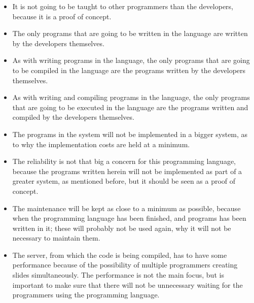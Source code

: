 \begin{itemize}
	\item It is not going to be taught to other programmers than the developers, because it is a proof of concept.
	\item The only programs that are going to be written in the language are written by the developers themselves.
	\item As with writing programs in the language, the only programs that are going to be compiled in the language are the programs written by the developers themselves.
	\item As with writing and compiling programs in the language, the only programs that are going to be executed in the language are the programs written and compiled by the developers themselves.
	\item The programs in the system will not be implemented in a bigger system, as to why the implementation costs are held at a minimum.
	\item The reliability is not that big a concern for this programming language, because the programs written herein will not be implemented as part of a greater system, as mentioned before, but it should be seen as a proof of concept.
	\item The maintenance will be kept as close to a minimum as possible, because when the programming language has been finished, and programs has been written in it; these will probably not be used again, why it will not be necessary to maintain them.
	\item The server, from which the code is being compiled, has to have some performance because of the possibility of multiple programmers creating slides simultaneously. The performance is not the main focus, but is important to make sure that there will not be unnecessary waiting for the programmers using the programming language.
\end{itemize}

